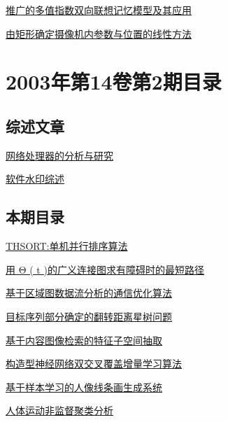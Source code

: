 \documentclass[a4paper]{article}
\begin{document}
\href{http://www.jos.org.cn/ch/reader/download_pdf.aspx?file_no=20030354&year_id=2003&quarter_id=3&falg=1}{推广的多值指数双向联想记忆模型及其应用}

\href{http://www.jos.org.cn/ch/reader/download_pdf.aspx?file_no=20030355&year_id=2003&quarter_id=3&falg=1}{由矩形确定摄像机内参数与位置的线性方法}


\section{\textbf{2003年第14卷第2期目录}}
\subsection{综述文章}
\href{http://www.jos.org.cn/ch/reader/download_pdf.aspx?file_no=20030214&year_id=2003&quarter_id=2&falg=1}{网络处理器的分析与研究}

\href{http://www.jos.org.cn/ch/reader/download_pdf.aspx?file_no=20030215&year_id=2003&quarter_id=2&falg=1}{软件水印综述}

\subsection{本期目录}
\href{http://www.jos.org.cn/ch/reader/download_pdf.aspx?file_no=20030201&year_id=2003&quarter_id=2&falg=1}{THSORT:单机并行排序算法}

\href{http://www.jos.org.cn/ch/reader/download_pdf.aspx?file_no=20030202&year_id=2003&quarter_id=2&falg=1}{用 Θ ( t )的广义连接图求有障碍时的最短路径}

\href{http://www.jos.org.cn/ch/reader/download_pdf.aspx?file_no=20030203&year_id=2003&quarter_id=2&falg=1}{基于区域图数据流分析的通信优化算法}

\href{http://www.jos.org.cn/ch/reader/download_pdf.aspx?file_no=20030204&year_id=2003&quarter_id=2&falg=1}{目标序列部分确定的翻转距离星树问题}

\href{http://www.jos.org.cn/ch/reader/download_pdf.aspx?file_no=20030205&year_id=2003&quarter_id=2&falg=1}{基于内容图像检索的特征子空间抽取}

\href{http://www.jos.org.cn/ch/reader/download_pdf.aspx?file_no=20030206&year_id=2003&quarter_id=2&falg=1}{构造型神经网络双交叉覆盖增量学习算法}

\href{http://www.jos.org.cn/ch/reader/download_pdf.aspx?file_no=20030207&year_id=2003&quarter_id=2&falg=1}{基于样本学习的人像线条画生成系统}

\href{http://www.jos.org.cn/ch/reader/download_pdf.aspx?file_no=20030208&year_id=2003&quarter_id=2&falg=1}{人体运动非监督聚类分析}
\end{document}

